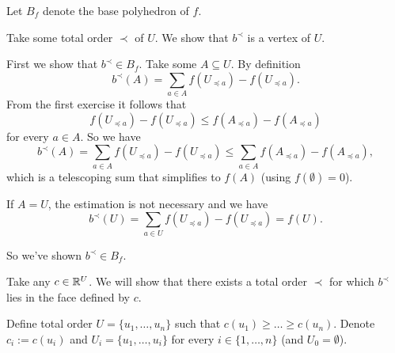 \begin{exercise}{3}
    Let $B_f$ denote the base polyhedron of $f$.

    Take some total order $\prec$ of $U$. We show that $b^\prec$ is a
    vertex of $U$.

    First we show that $b^\prec \in B_f$.
    Take some $A \subseteq U$.
    By definition
    \begin{equation*}
        b^\prec (A) = \sum_{a \in A} f(U_{\preceq a}) - f(U_{\preceq a}).
    \end{equation*}
    From the first exercise it follows that
    \begin{equation*}
        f(U_{\preceq a}) - f(U_{\preceq a}) \leq f(A_{\preceq a}) - f(A_{\preceq a})
    \end{equation*}
    for every $a \in
    A$. So we have
    \begin{equation*}
        b^\prec (A) = \sum_{a \in A} f(U_{\preceq a}) - f(U_{\preceq
        a}) \leq \sum_{a \in A} f(A_{\preceq a}) - f(A_{\preceq a}),
    \end{equation*}
    which is a telescoping sum that simplifies to $f(A)$ (using $f(\emptyset)
    = 0$).

    If $A = U$, the estimation is not necessary and we have
    \begin{equation*}
        b^\prec (U) = \sum_{a \in U} f(U_{\preceq a}) - f(U_{\preceq a}) = f(U).
    \end{equation*}

    So we've shown $b^\prec \in B_f$.

    Take any $c \in \mathbb{R}^U$. We will show that there exists a total order $\prec$
    for which $b^\prec$ lies in the face defined by $c$.

    Define total order $U = \{u_1, \dots, u_n\}$ such that $c(u_1) \geq \dots
    \geq c(u_n)$. Denote $c_i := c(u_i)$ and $U_i = \{u_1, \dots, u_i\}$ for every $i \in \{1,
    \dots, n\}$ (and $U_0 = \emptyset$).


\end{exercise}
